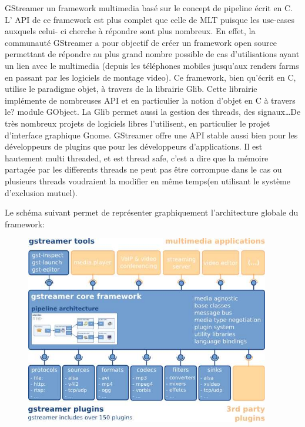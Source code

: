 {GStreamer un framework multimedia basé sur le concept de pipeline
écrit en C.  L' API de ce framework est plus complet que celle de
MLT puisque les use-cases auxquels celui- ci cherche à répondre sont
plus nombreux. En effet, la communauté GStreamer a pour objectif de
créer un framework open source permettant de répondre au plus grand
nombre possible de cas d'utilisations ayant un lien avec le multimedia
(depuis les téléphones mobiles jusqu'aux renders farms en passant par les
logiciels de montage video).  Ce framework, bien qu'écrit en C,
utilise le paradigme objet, à travers de la librairie Glib. Cette
librairie implémente de nombreuses API et en particulier la notion
d'objet en C à travers le? module GObject. La Glib permet aussi la
gestion des threads, des signaux\ldots De très nombreux projets
de logiciels libres l'utilisent, en particulier le projet d'interface
graphique Gnome. GStreamer offre une API stable aussi bien pour les
développeurs de plugins que pour les développeurs d'applications. Il
est hautement multi threaded, et est thread safe,
c'est a dire que la mémoire partagée par les differents threads ne
peut pas être corrompue dans le cas ou plusieurs threads voudraient la modifier
en même temps(en utilisant le système d'exclusion mutuel).

Le schéma suivant permet de représenter graphiquement l'architecture
globale du framework:

\begin{figure} [H]

  \begin{center}

    \includegraphics[width=0.95\textwidth]{images/gstoverview}


\end{center}
\end{figure}}

